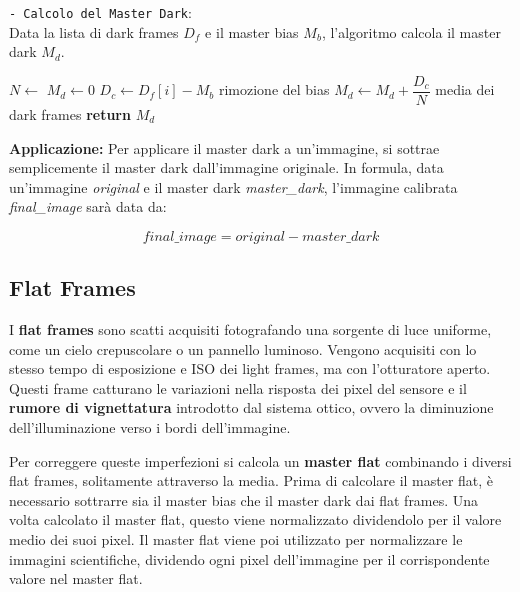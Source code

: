\begin{algorithm}[H]
    \caption{\texttt{- Calcolo del Master Dark}:\\ Data la lista di dark frames $D_f$ e il master bias $M_b$, l'algoritmo calcola il master dark $M_d$.} \label{alg:dark}
    \begin{algorithmic}[1]
            \State $N \gets$ 
            \State $M_d \gets 0$
                \State $ D_c \gets D_f[i] - M_b$ \Comment rimozione del bias
                \State $M_d \gets M_d + \dfrac {D_c} N$ \Comment media dei dark frames
            \EndFor
            \State \textbf{return} $M_d$
        \EndFunction
    \end{algorithmic}
\end{algorithm}

\textbf{Applicazione:} Per applicare il master dark a un'immagine, si sottrae semplicemente il master dark dall'immagine originale. In formula, data un'immagine \textit{original} e il master dark \textit{master\_dark}, l'immagine calibrata \textit{final\_image} sarà data da:

$$
    final\_image = original - master\_dark
$$

\subsection{Flat Frames} \label{subsec:flat}

I \textbf{flat frames} sono scatti acquisiti fotografando una sorgente di luce uniforme, come un cielo crepuscolare o un pannello luminoso. Vengono acquisiti con lo stesso tempo di esposizione e ISO dei light frames, ma con l'otturatore aperto. Questi frame catturano le variazioni nella risposta dei pixel del sensore e il \textbf{rumore di vignettatura} introdotto dal sistema ottico, ovvero la diminuzione dell'illuminazione verso i bordi dell'immagine.

Per correggere queste imperfezioni si calcola un \textbf{master flat} combinando i diversi flat frames, solitamente attraverso la media. Prima di calcolare il master flat, è necessario sottrarre sia il master bias che il master dark dai flat frames. Una volta calcolato il master flat, questo viene normalizzato dividendolo per il valore medio dei suoi pixel. Il master flat viene poi utilizzato per normalizzare le immagini scientifiche, dividendo ogni pixel dell'immagine per il corrispondente valore nel master flat.

